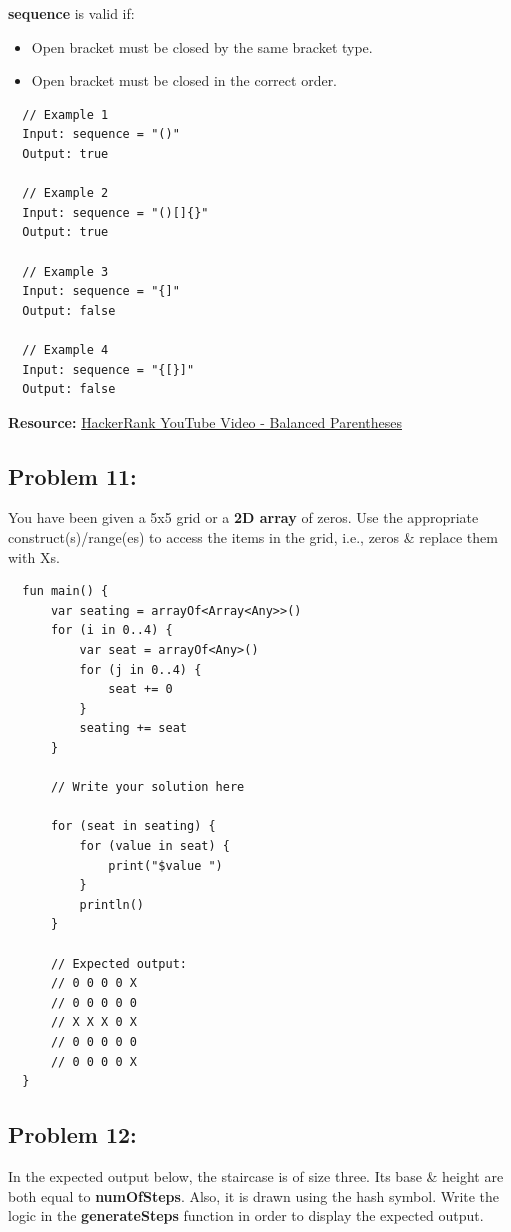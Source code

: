 \documentclass{article}
\begin{document}
\textbf{sequence} is valid if:
\begin{itemize}
  \item Open bracket must be closed by the same bracket type.
  \item Open bracket must be closed in the correct order.
\end{itemize}

\begin{verbatim}
  // Example 1
  Input: sequence = "()"
  Output: true

  // Example 2
  Input: sequence = "()[]{}"
  Output: true

  // Example 3
  Input: sequence = "{]"
  Output: false

  // Example 4
  Input: sequence = "{[}]"
  Output: false
\end{verbatim}

\textbf{Resource:} \href{https://www.youtube.com/watch?v=IhJGJG-9Dx8}{HackerRank YouTube Video - Balanced Parentheses}

\subsection*{Problem 11:}
You have been given a 5x5 grid or a \textbf{2D array} of zeros. Use the appropriate construct(s)/range(es) to access the items in the grid, i.e., zeros \& replace them with Xs.

\begin{verbatim}
  fun main() {
      var seating = arrayOf<Array<Any>>()
      for (i in 0..4) {
          var seat = arrayOf<Any>()
          for (j in 0..4) {
              seat += 0
          }
          seating += seat
      }

      // Write your solution here

      for (seat in seating) {
          for (value in seat) {
              print("$value ")
          }
          println()
      }

      // Expected output:
      // 0 0 0 0 X 
      // 0 0 0 0 0 
      // X X X 0 X 
      // 0 0 0 0 0 
      // 0 0 0 0 X
  }
\end{verbatim}

\subsection*{Problem 12:}
In the expected output below, the staircase is of size three. Its base \& height are both equal to \textbf{numOfSteps}. Also, it is drawn using the hash symbol. Write the logic in the \textbf{generateSteps} function in order to display the expected output.
\end{document}
